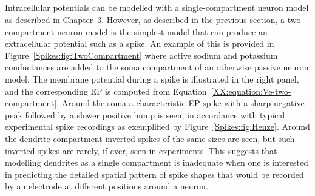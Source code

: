 \subsection{}
\label{Spikes:sec:EP-spikes-two-compartment}
Intracellular potentials can be modelled with a single-compartment neuron model as described in Chapter~3.
However, as described in the previous section, 
a two-compartment neuron model is the simplest model that can produce an extracellular potential such as a 
spike. An example of this is provided in Figure~\ref{Spikes:fig:TwoCompartment} where active sodium and potassium conductances are added to the  soma compartment of an otherwise passive neuron model. 
The membrane potential during a spike is illustrated in the right panel, and the  
corresponding EP is computed from Equation~\ref{XX:equation:Ve-two-compartment}. Around the soma a characteristic
EP spike with a sharp negative peak followed by a slower positive hump is seen, in accordance with typical experimental
spike recordings as exemplified by Figure~\ref{Spikes:fig:Henze}. Around the dendrite compartment inverted
spikes of the same sizes are seen, but such inverted spikes are rarely, if ever, seen in experiments. This suggests that
modelling dendrites as a single compartment is inadequate when one is interested in predicting the detailed spatial pattern of 
spike shapes that would be recorded by an electrode at different positions around a neuron.                                                                                                                                                                                                                                                                                                                                                                                                                                                                                                                                                                                                                                                                                                                                                                                                                                                                                                                                                                                                                                                                                                                                 

